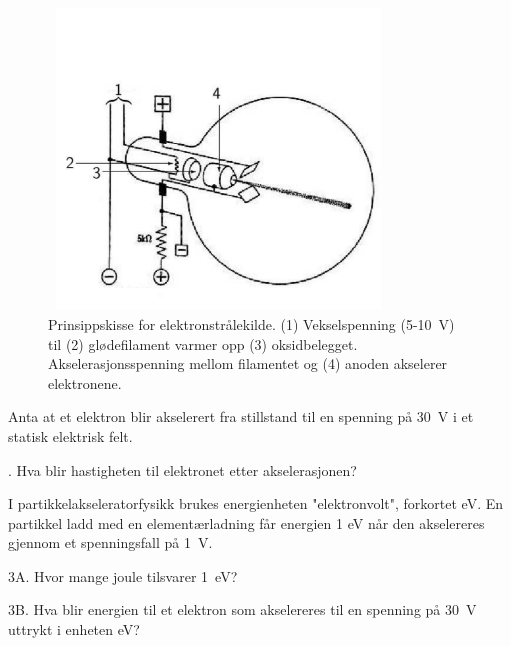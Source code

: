 \documentclass[../Elmag-labhefte-2020.tex]{subfiles}
\begin{document}
\begin{figure}[!h]
    \vspace{-2cm}
    \centering
    \includegraphics[width=9cm,height=8cm,keepaspectratio]{fig/LorentzFig1_resized.pdf}
    \caption{%
        Prinsippskisse for elektronstrålekilde. 
        (1) Vekselspenning (5-\SI{10}{\volt}) til 
        (2) glødefilament varmer opp 
        (3) oksidbelegget. 
        Akselerasjonsspenning mellom filamentet og 
        (4) anoden akselerer elektronene.
    }
    \label{lorentz.fig1}
\end{figure}

Anta at et elektron blir akselerert fra stillstand til en spenning på \SI{30}{\volt} i et statisk elektrisk felt. 

{. Hva blir hastigheten til elektronet etter akselerasjonen? }

I partikkelakseleratorfysikk brukes energienheten "elektronvolt", forkortet \si{\eV}. En partikkel ladd med en elementærladning får energien 1 eV når den akselereres gjennom et spenningsfall på \SI{1}{\volt}.  

{\itsf 3A.  Hvor mange joule tilsvarer \SI{1}{\eV}? } 

{\itsf 3B.  Hva blir energien til et elektron som akselereres til en spenning på \SI{30}{\volt} uttrykt i enheten \si{\eV}?}
 
\end{document}
